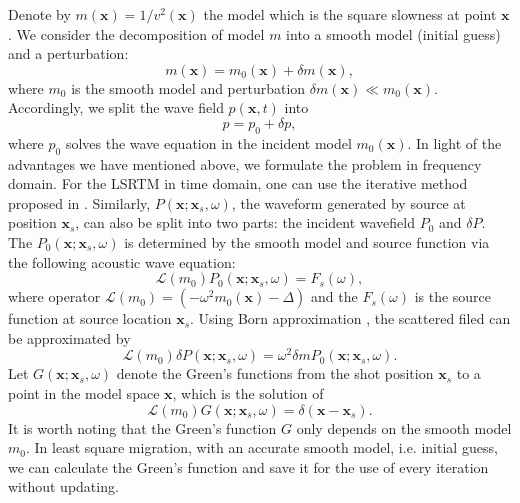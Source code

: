 \documentclass[11pt,titlepage]{article}
\newcommand{\cL}{\mathcal{L}}
\newcommand{\bx}{\boldsymbol{x}}
\theoremstyle{plain}
\theoremstyle{definition}
\theoremstyle{remark}
\numberwithin{equation}{section}
\begin{document}
Denote by $m(\bx)=1/v^2(\bx)$ the model which is the square slowness at point $\bx$. We consider the decomposition of model $m$ into a smooth model (initial guess) and a perturbation:
\begin{equation}
m(\bx)=m_0(\bx)+\delta m(\bx),
\end{equation} 
where $m_0$ is the smooth model and perturbation $\delta m(\bx) \ll m_0(\bx)$. Accordingly, we split the wave field $p(\bx,t)$ into 
\begin{equation}
p=p_0+\delta p,
\end{equation}
where $p_0$ solves the wave equation in the incident model $m_0(\bx)$. In light of the advantages we have mentioned above, we formulate the problem in frequency domain. For the LSRTM in time domain, one can use the iterative method proposed in \cite{Dong:2012aa}. Similarly, $P(\bx;\bx_s, \omega)$, the waveform generated by source at position $\bx_s$, can also be split into two parts: the incident wavefield $P_0$ and $\delta P$. The $P_0(\bx; \bx_s, \omega)$ is determined by the smooth model and source function via the following acoustic wave equation:
\begin{equation}
\cL( m_0) P_0(\bx; \bx_s, \omega)=F_s(\omega),
\end{equation} 
where operator $\cL( m_0)=(-\omega^2 m_0(\bx)-\Delta)$ and the $F_s(\omega)$ is the source function at source location $\bx_s$. Using Born approximation \cite{Tarantola:1988aa}, the scattered filed can be approximated by  
\begin{equation}
\cL( m_0)\delta P(\bx;\bx_s,\omega) =\omega^2 \delta m P_0(\bx;\bx_s,\omega).
\end{equation}
Let $G(\bx; \bx_s, \omega)$ denote the Green's functions from the shot position $\bx_s$ to a point in the model space $\bx$, which is the solution of 
\begin{equation}
\cL(m_0)G(\bx;\bx_s,\omega)=\delta(\bx-\bx_s).
\end{equation}
It is worth noting that the Green's function $G$ only depends on the smooth model $m_0$. In least square migration, with an accurate smooth model, i.e. initial guess, we can calculate the Green's function and save it for the use of every iteration without updating. 
  
\end{document}
